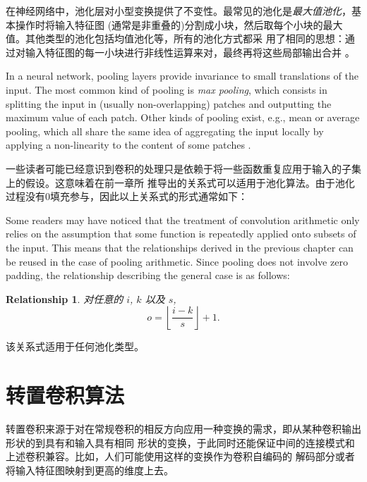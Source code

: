 \documentclass[notitlepage]{report}
\newtheorem{relationship}{Relationship}
\begin{document}
在神经网络中，池化层对小型变换提供了不变性。最常见的池化是\emph{最大值池化}，基本操作时将输入特征图
(通常是非重叠的)分割成小块，然后取每个小块的最大值。其他类型的池化包括均值池化等，所有的池化方式都采
用了相同的思想：通过对输入特征图的每一小块进行非线性运算来对，最终再将这些局部输出合并
\citep{%
boureau-cvpr-10,boureau-icml-10,boureau-iccv-11,ICML2011Saxe_551}。

In a neural network, pooling layers provide invariance to small translations of
the input. The most common kind of pooling is \emph{max pooling}, which
consists in splitting the input in (usually non-overlapping) patches and
outputting the maximum value of each patch. Other kinds of pooling exist, e.g.,
mean or average pooling, which all share the same idea of aggregating the input
locally by applying a non-linearity to the content of some patches \citep{%
boureau-cvpr-10,boureau-icml-10,boureau-iccv-11,ICML2011Saxe_551}.

一些读者可能已经意识到卷积的处理只是依赖于将一些函数重复应用于输入的子集上的假设。这意味着在前一章所
推导出的关系式可以适用于池化算法。由于池化过程没有0填充参与，因此以上关系式的形式通常如下：

Some readers may have noticed that the treatment of convolution arithmetic only
relies on the assumption that some function is repeatedly applied onto subsets
of the input. This means that the relationships derived in the previous chapter
can be reused in the case of pooling arithmetic. Since pooling does not involve
zero padding, the relationship describing the general case is as follows:

\begin{relationship}\label{rel:pooling}
对任意的 $i$, $k$ 以及 $s$,
\begin{equation*}
    o = \left\lfloor \frac{i - k}{s} \right\rfloor + 1.
\end{equation*}
\end{relationship}

\noindent 该关系式适用于任何池化类型。

\chapter{转置卷积算法}

转置卷积来源于对在常规卷积的相反方向应用一种变换的需求，即从某种卷积输出形状的到具有和输入具有相同
形状的变换，于此同时还能保证中间的连接模式和上述卷积兼容。比如，人们可能使用这样的变换作为卷积自编码的
解码部分或者将输入特征图映射到更高的维度上去。
\end{document}
